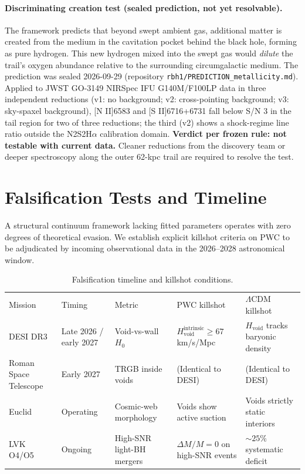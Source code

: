 \documentclass[aps,prd,twocolumn,superscriptaddress,amsmath,amssymb,nofootinbib,floatfix]{revtex4-2}
\begin{document}
\paragraph*{Discriminating creation test (sealed prediction, not yet resolvable).}
The framework predicts that beyond swept ambient gas, additional matter is created from the medium in the cavitation pocket behind the black hole, forming as pure hydrogen. This new hydrogen mixed into the swept gas would \emph{dilute} the trail's oxygen abundance relative to the surrounding circumgalactic medium. The prediction was sealed 2026-09-29 (repository \texttt{rbh1/PREDICTION\_metallicity.md}). Applied to JWST GO-3149 NIRSpec IFU G140M/F100LP data in three independent reductions (v1: no background; v2: cross-pointing background; v3: sky-spaxel background), [N II]6583 and [S II]6716+6731 fall below S/N 3 in the tail region for two of three reductions; the third (v2) shows a shock-regime line ratio outside the N2S2H$\alpha$ calibration domain. \textbf{Verdict per frozen rule: not testable with current data.} Cleaner reductions from the discovery team or deeper spectroscopy along the outer 62-kpc trail are required to resolve the test.

\section{Falsification Tests and Timeline}
\label{sec:falsification}

A structural continuum framework lacking fitted parameters operates with zero degrees of theoretical evasion. We establish explicit killshot criteria on PWC to be adjudicated by incoming observational data in the 2026--2028 astronomical window.

\begin{table}[t]
\centering
\caption{Falsification timeline and killshot conditions.}
\label{tab:falsification}
\begin{ruledtabular}
\begin{tabular}{lllll}
Mission & Timing & Metric & PWC killshot & $\Lambda$CDM killshot \\
\colrule
DESI DR3 & Late 2026 / early 2027 & Void-vs-wall $H_0$ & $H_{\text{void}}^{\text{intrinsic}} \geq 67$ km/s/Mpc & $H_{\text{void}}$ tracks baryonic density \\
Roman Space Telescope & Early 2027 & TRGB inside voids & (Identical to DESI) & (Identical to DESI) \\
Euclid & Operating & Cosmic-web morphology & Voids show active suction & Voids strictly static interiors \\
LVK O4/O5 & Ongoing & High-SNR light-BH mergers & $\Delta M/M = 0$ on high-SNR events & $\sim 25\%$ systematic deficit \\
\end{tabular}
\end{ruledtabular}
\end{table}
\end{document}
